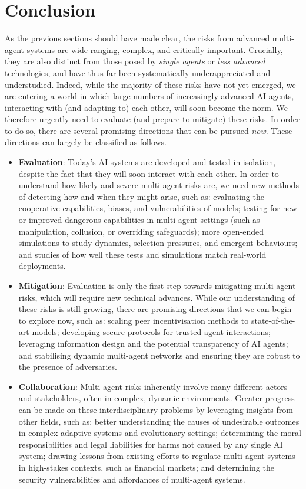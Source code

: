 \section{Conclusion}
\label{sec:conclusion}

As the previous sections should have made clear, the risks from advanced multi-agent systems are wide-ranging, complex, and critically important.
Crucially, they are also distinct from those posed by \textit{single agents} or \textit{less advanced} technologies, and have thus far been systematically underappreciated and understudied.
Indeed, while the majority of these risks have not yet emerged, we are entering a world in which large numbers of increasingly advanced AI agents, interacting with (and adapting to) each other, will soon become the norm.
We therefore urgently need to evaluate (and prepare to mitigate) these risks.
In order to do so, there are several promising directions that can be pursued \textit{now}. 
These directions can largely be classified as follows.

\begin{itemize}
    \item \textbf{Evaluation}: Today's AI systems are developed and tested in isolation, despite the fact that they will soon interact with each other.
    In order to understand how likely and severe multi-agent risks are, we need new methods of detecting how and when they might arise, such as:
    evaluating the cooperative capabilities, biases, and vulnerabilities of models; 
    testing for new or improved dangerous capabilities in multi-agent settings (such as manipulation, collusion, or overriding safeguards); 
    more open-ended simulations to study dynamics, selection pressures, and emergent behaviours;
    and studies of how well these tests and simulations match real-world deployments.  
    \item \textbf{Mitigation}: Evaluation is only the first step towards mitigating multi-agent risks, which will require new technical advances.
    While our understanding of these risks is still growing, there are promising directions that we can begin to explore now, such as:
    scaling peer incentivisation methods to state-of-the-art models;
    developing secure protocols for trusted agent interactions; 
    leveraging information design and the potential transparency of AI agents; and
    stabilising dynamic multi-agent networks and ensuring they are robust to the presence of adversaries.
    \item \textbf{Collaboration}: Multi-agent risks inherently involve many different actors and stakeholders, often in complex, dynamic environments.
    Greater progress can be made on these interdisciplinary problems by leveraging insights from other fields, such as:
    better understanding the causes of undesirable outcomes in complex adaptive systems and evolutionary settings;
    determining the moral responsibilities and legal liabilities for harms not caused by any single AI system;
    drawing lessons from existing efforts to regulate multi-agent systems in high-stakes contexts, such as financial markets;
    and determining the security vulnerabilities and affordances of multi-agent systems.
\end{itemize}


